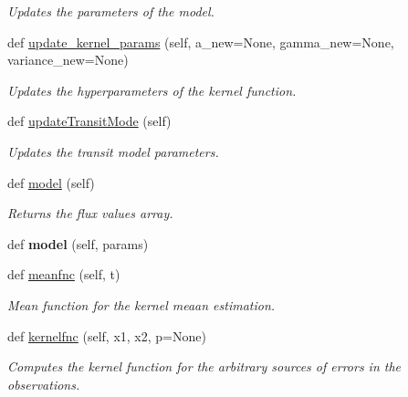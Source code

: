 \begin{DoxyCompactItemize}
\begin{DoxyCompactList}\small\item\em Updates the parameters of the model. \end{DoxyCompactList}\item 
def \hyperlink{classexospec_1_1_transit_model_1_1_transit_model_a13b851f80d01379553c454f576c79ae5}{update\+\_\+kernel\+\_\+params} (self, a\+\_\+new=None, gamma\+\_\+new=None, variance\+\_\+new=None)
\begin{DoxyCompactList}\small\item\em Updates the hyperparameters of the kernel function. \end{DoxyCompactList}\item 
def \hyperlink{classexospec_1_1_transit_model_1_1_transit_model_abd4eed9477412e6eb684570c3372984b}{update\+Transit\+Mode} (self)
\begin{DoxyCompactList}\small\item\em Updates the transit model parameters. \end{DoxyCompactList}\item 
def \hyperlink{classexospec_1_1_transit_model_1_1_transit_model_abba00977f8fb6ff65f89e2f3e7037ea9}{model} (self)
\begin{DoxyCompactList}\small\item\em Returns the flux values array. \end{DoxyCompactList}\item 
\mbox{\label{classexospec_1_1_transit_model_1_1_transit_model_a1a51a8b175518601892d180c83354592}} 
def {\bfseries model} (self, params)
\item 
def \hyperlink{classexospec_1_1_transit_model_1_1_transit_model_a4c2121aaf3b3a170e9f0ec0c18911608}{meanfnc} (self, t)
\begin{DoxyCompactList}\small\item\em Mean function for the kernel meaan estimation. \end{DoxyCompactList}\item 
def \hyperlink{classexospec_1_1_transit_model_1_1_transit_model_a4e41db96fc3b1b134bfce74aad263b50}{kernelfnc} (self, x1, x2, p=None)
\begin{DoxyCompactList}\small\item\em Computes the kernel function for the arbitrary sources of errors in the observations. \end{DoxyCompactList}\item 

\end{DoxyCompactItemize}

